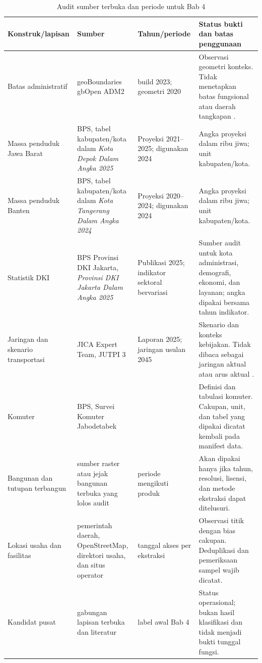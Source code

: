 \documentclass[11pt,a4paper,oneside,openany,indonesian]{report}
\begin{document}
\begin{table}[H]
\centering
\caption{Audit sumber terbuka dan periode untuk Bab 4}
\label{tab:bab4-audit}
\begin{tabularx}{\textwidth}{>{\raggedright\arraybackslash}p{} >{\raggedright\arraybackslash}p{} >{\raggedright\arraybackslash}p{} >{\raggedright\arraybackslash}X}
\toprule
Konstruk/lapisan & Sumber & Tahun/periode & Status bukti dan batas penggunaan \\
\midrule
Batas administratif & geoBoundaries gbOpen ADM2 & build 2023; geometri 2020 & Observasi geometri konteks. Tidak menetapkan batas fungsional atau daerah tangkapan \parencite{geoboundaries2023}. \\
Massa penduduk Jawa Barat & BPS, tabel kabupaten/kota dalam \emph{Kota Depok Dalam Angka 2025} & Proyeksi 2021--2025; digunakan 2024 & Angka proyeksi dalam ribu jiwa; unit kabupaten/kota. \\
Massa penduduk Banten & BPS, tabel kabupaten/kota dalam \emph{Kota Tangerang Dalam Angka 2024} & Proyeksi 2020--2024; digunakan 2024 & Angka proyeksi dalam ribu jiwa; unit kabupaten/kota. \\
Statistik DKI & BPS Provinsi DKI Jakarta, \emph{Provinsi DKI Jakarta Dalam Angka 2025} & Publikasi 2025; indikator sektoral bervariasi & Sumber audit untuk kota administrasi, demografi, ekonomi, dan layanan; angka dipakai bersama tahun indikator. \\
Jaringan dan skenario transportasi & JICA Expert Team, JUTPI 3 & Laporan 2025; jaringan usulan 2045 & Skenario dan konteks kebijakan. Tidak dibaca sebagai jaringan aktual atau arus aktual \parencite{jica2025jutpi}. \\
Komuter & BPS, Survei Komuter Jabodetabek & 2023 & Definisi dan tabulasi komuter. Cakupan, unit, dan tabel yang dipakai dicatat kembali pada manifest data. \\
Bangunan dan tutupan terbangun & sumber raster atau jejak bangunan terbuka yang lolos audit & periode mengikuti produk & Akan dipakai hanya jika tahun, resolusi, lisensi, dan metode ekstraksi dapat ditelusuri. \\
Lokasi usaha dan fasilitas & pemerintah daerah, OpenStreetMap, direktori usaha, dan situs operator & tanggal akses per ekstraksi & Observasi titik dengan bias cakupan. Deduplikasi dan pemeriksaan sampel wajib dicatat. \\
Kandidat pusat & gabungan lapisan terbuka dan literatur & label awal Bab 4 & Status operasional; bukan hasil klasifikasi dan tidak menjadi bukti tunggal fungsi. \\
\bottomrule
\end{tabularx}
\end{table}
\end{document}
